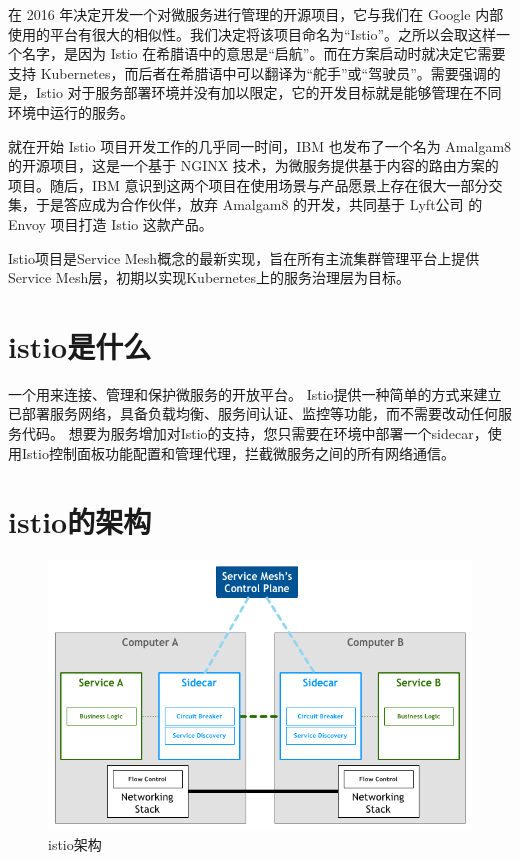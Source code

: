 \documentclass{ctexart}
\begin{document}
在 2016 年决定开发一个对微服务进行管理的开源项目，它与我们在 Google 内部使用的平台有很大的相似性。我们决定将该项目命名为“Istio”。之所以会取这样一个名字，是因为 Istio 在希腊语中的意思是“启航”。而在方案启动时就决定它需要支持 Kubernetes，而后者在希腊语中可以翻译为“舵手”或“驾驶员”。需要强调的是，Istio 对于服务部署环境并没有加以限定，它的开发目标就是能够管理在不同环境中运行的服务。

就在开始 Istio 项目开发工作的几乎同一时间，IBM 也发布了一个名为 Amalgam8 的开源项目，这是一个基于 NGINX 技术，为微服务提供基于内容的路由方案的项目。随后，IBM 意识到这两个项目在使用场景与产品愿景上存在很大一部分交集，于是答应成为合作伙伴，放弃 Amalgam8 的开发，共同基于 Lyft公司 的 Envoy 项目打造 Istio 这款产品。

Istio项目是Service Mesh概念的最新实现，旨在所有主流集群管理平台上提供Service Mesh层，初期以实现Kubernetes上的服务治理层为目标。

\section{istio是什么}
一个用来连接、管理和保护微服务的开放平台。 
Istio提供一种简单的方式来建立已部署服务网络，具备负载均衡、服务间认证、监控等功能，而不需要改动任何服务代码。
想要为服务增加对Istio的支持，您只需要在环境中部署一个sidecar，使用Istio控制面板功能配置和管理代理，拦截微服务之间的所有网络通信。


\section{istio的架构}
\begin{figure}[H]
\includegraphics[scale=0.6]{istio/framework.png}
\caption{istio架构}
\end{figure}
\end{document}
